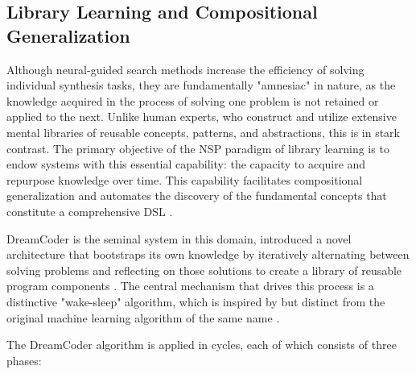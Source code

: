\documentclass[12pt, a4paper]{report}
\begin{document}
\subsection{Library Learning and Compositional Generalization}
Although neural-guided search methods increase the efficiency of solving individual synthesis tasks, they are fundamentally "amnesiac" in nature, as the knowledge acquired in the process of solving one problem is not retained or applied to the next. Unlike human experts, who construct and utilize extensive mental libraries of reusable concepts, patterns, and abstractions, this is in stark contrast. The primary objective of the NSP paradigm of library learning is to endow systems with this essential capability: the capacity to acquire and repurpose knowledge over time. This capability facilitates compositional generalization and automates the discovery of the fundamental concepts that constitute a comprehensive DSL \citep{ellis2021dreamcoder}.

DreamCoder is the seminal system in this domain, introduced a novel architecture that bootstraps its own knowledge by iteratively alternating between solving problems and reflecting on those solutions to create a library of reusable program components \citep{ellis2021dreamcoder}. The central mechanism that drives this process is a distinctive "wake-sleep" algorithm, which is inspired by but distinct from the original machine learning algorithm of the same name \citep{ellis2021dreamcoder}.

The DreamCoder algorithm is applied in cycles, each of which consists of three phases:
\end{document}
